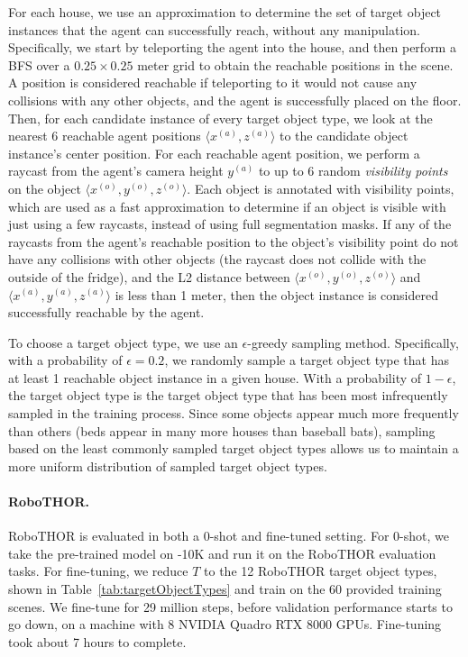 For each house, we use an approximation to determine the set of target object instances that the agent can successfully reach, without any manipulation. Specifically, we start by teleporting the agent into the house, and then perform a BFS over a $0.25\times 0.25$ meter grid to obtain the reachable positions in the scene. A position is considered reachable if teleporting to it would not cause any collisions with any other objects, and the agent is successfully placed on the floor. Then, for each candidate instance of every target object type, we look at the nearest 6 reachable agent positions $\langle x^{(a)}, z^{(a)}\rangle$ to the candidate object instance's center position. For each reachable agent position, we perform a raycast from the agent's camera height $y^{(a)}$ to up to 6 random \textit{visibility points} on the object $\langle x^{(o)}, y^{(o)}, z^{(o)}\rangle$. Each object is annotated with visibility points, which are used as a fast approximation to determine if an object is visible with just using a few raycasts, instead of using full segmentation masks. If any of the raycasts from the agent's reachable position to the object's visibility point do not have any collisions with other objects (\eg the raycast does not collide with the outside of the fridge), and the L2 distance between $\langle x^{(o)}, y^{(o)}, z^{(o)}\rangle$ and $\langle x^{(a)}, y^{(a)}, z^{(a)}\rangle$ is less than 1 meter, then the object instance is considered successfully reachable by the agent.

To choose a target object type, we use an $\epsilon$-greedy sampling method. Specifically, with a probability of $\epsilon=0.2$, we randomly sample a target object type that has at least 1 reachable object instance in a given house. With a probability of $1-\epsilon$, the target object type is the target object type that has been most infrequently sampled in the training process. Since some objects appear much more frequently than others (\eg beds appear in many more houses than baseball bats), sampling based on the least commonly sampled target object types allows us to maintain a more uniform distribution of sampled target object types.

\paragraph{RoboTHOR.} RoboTHOR is evaluated in both a 0-shot and fine-tuned setting. For 0-shot, we take the pre-trained model on \env{}-10K and run it on the RoboTHOR evaluation tasks. For fine-tuning, we reduce $T$ to the 12 RoboTHOR target object types, shown in Table~\ref{tab:targetObjectTypes} and train on the 60 provided training scenes. We fine-tune for 29 million steps, before validation performance starts to go down, on a machine with 8 NVIDIA Quadro RTX 8000 GPUs. Fine-tuning took about 7 hours to complete.


